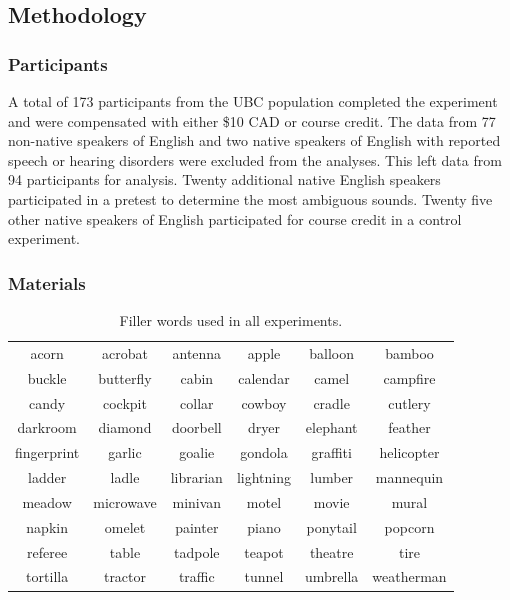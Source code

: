 \subsection{Methodology}

\subsubsection{Participants}

A total of 173 participants from the UBC population completed the experiment and were compensated with either \$10 CAD or course credit.  
The data from 77 non-native speakers of English and two native speakers of English with reported speech or hearing disorders were excluded from the analyses.
This left data from 94 participants for analysis.
Twenty additional native English speakers participated in a pretest to determine the most ambiguous sounds.  
Twenty five other native speakers of English participated for course credit in a control experiment.

\subsubsection{Materials}

\begin{table}[h]
\caption{Filler words used in all experiments.}
\label{tbl:fillerwords}
\centering
\begin{tabular}{cccccc}
\toprule
acorn       & acrobat   & antenna   & apple     & balloon  & bamboo     \\
buckle      & butterfly & cabin     & calendar  & camel    & campfire   \\
candy       & cockpit   & collar    & cowboy    & cradle   & cutlery    \\
darkroom    & diamond   & doorbell  & dryer     & elephant & feather    \\
fingerprint & garlic    & goalie    & gondola   & graffiti & helicopter \\
ladder      & ladle     & librarian & lightning & lumber   & mannequin  \\
meadow      & microwave & minivan   & motel     & movie    & mural      \\
napkin      & omelet    & painter   & piano     & ponytail & popcorn    \\
referee     & table     & tadpole   & teapot    & theatre  & tire       \\
tortilla    & tractor   & traffic   & tunnel    & umbrella & weatherman\\
\bottomrule
\end{tabular}
\end{table}

